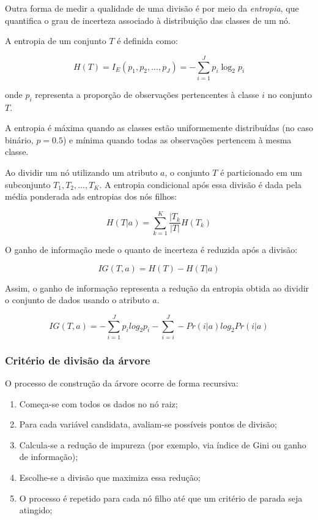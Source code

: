 \documentclass{article}
\begin{document}
Outra forma de medir a qualidade de uma divisão é por meio da 
\textit{entropia}, que quantifica o grau de incerteza associado à
distribuição das classes de um nó.

A entropia de um conjunto $T$ é definida como:

\begin{equation}
    H(T) = I_{E}(p_1, p_2, ..., p_J) = -\sum_{i = 1}^{J}p_i \log_2 p_i
\end{equation}

onde $p_i$ representa a proporção de observações pertencentes à 
classe $i$ no conjunto $T$.

A entropia é máxima quando as classes estão uniformemente distribuídas
(no caso binário, $p = 0.5$) e mínima quando todas as observações pertencem
à mesma classe.

Ao dividir um nó utilizando um atributo $a$, o conjunto $T$ é particionado
em um subconjunto $T_1, T_2, ..., T_K$. A entropia condicional após essa 
divisão é dada pela média ponderada ads entropias dos nós filhos:

\begin{equation}
    H(T | a) = \sum_{k = 1}^{K} \frac{|T_k}{|T|} H(T_k)
\end{equation}

O ganho de informação mede o quanto de incerteza é reduzida após a 
divisão:

\begin{equation}
    IG(T, a) = H(T) - H(T | a)
\end{equation}

Assim, o ganho de informação representa a redução da entropia obtida 
ao dividir o conjunto de dados usando o atributo $a$.

\begin{equation}
    IG(T, a) = -\sum_{i = 1}^{J} p_i log_2 p_i - \sum_{i = i}^{J} -Pr(i | a)log_2 Pr(i | a)
\end{equation}

\subsubsection{Critério de divisão da árvore}

O processo de construção da árvore ocorre de forma recursiva:

\begin{enumerate}
    \item Começa-se com todos os dados no nó raiz;
    \item Para cada variável candidata, avaliam-se possíveis pontos de divisão;
    \item Calcula-se a redução de impureza (por exemplo, via índice de Gini
    ou ganho de informação);
    \item Escolhe-se a divisão que maximiza essa redução;
    \item O processo é repetido para cada nó filho até que um critério de parada
    seja atingido;
\end{enumerate}
\end{document}
